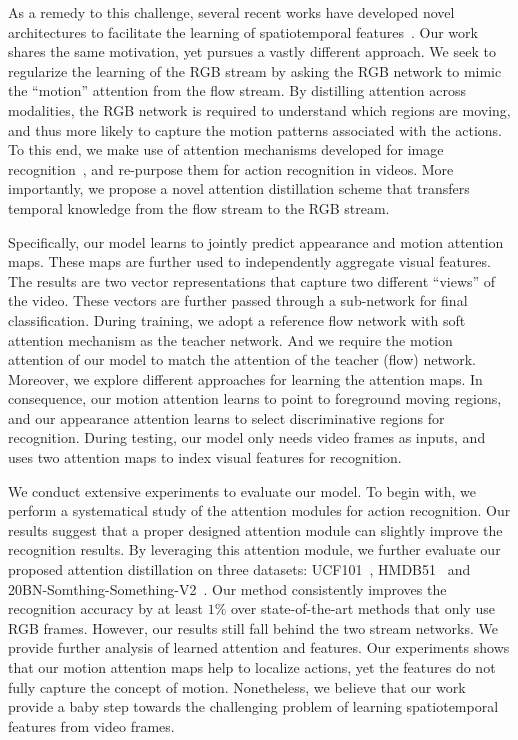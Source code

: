 \documentclass[10pt,twocolumn,letterpaper]{article}
\begin{document}
As a remedy to this challenge, several recent works have developed novel architectures to facilitate the learning of spatiotemporal features~\cite{Hara_2018_CVPR,Tran_2018_CVPR,Xie_2018_ECCV,Sun_2018_CVPR,fan2018end}. Our work shares the same motivation, yet pursues a vastly different approach. We seek to regularize the learning of the RGB stream by asking the RGB network to mimic the ``motion'' attention from the flow stream. By distilling attention across modalities, the RGB network is required to understand which regions are moving, and thus more likely to capture the motion patterns associated with the actions. To this end, we make use of attention mechanisms developed for image recognition~\cite{wang2017residual,Zagoruyko2017AT}, and re-purpose them for action recognition in videos. More importantly, we propose a novel attention distillation scheme that transfers temporal knowledge from the flow stream to the RGB stream. 

Specifically, our model learns to jointly predict appearance and motion attention maps. These maps are further used to independently aggregate visual features. The results are two vector representations that capture two different ``views'' of the video. These vectors are further passed through a sub-network for final classification. During training, we adopt a reference flow network with soft attention mechanism as the teacher network. And we require the motion attention of our model to match the attention of the teacher (flow) network. Moreover, we explore different approaches for learning the attention maps. In consequence, our motion attention learns to point to foreground moving regions, and our appearance attention learns to select discriminative regions for recognition. During testing, our model only needs video frames as inputs, and uses two attention maps to index visual features for recognition. 

We conduct extensive experiments to evaluate our model. To begin with, we perform a systematical study of the attention modules for action recognition. Our results suggest that a proper designed attention module can slightly improve the recognition results. By leveraging this attention module, we further evaluate our proposed attention distillation on three datasets: UCF101~\cite{Soomro2012UCF101AD}, HMDB51~\cite{kuehne2011hmdb} and 20BN-Somthing-Something-V2~\cite{goyal2017something,mahdisoltani2018fine}. Our method consistently improves the recognition accuracy by at least $1\%$ over state-of-the-art methods that only use RGB frames. However, our results still fall behind the two stream networks. We provide further analysis of learned attention and features. Our experiments shows that our motion attention maps help to localize actions, yet the features do not fully capture the concept of motion. Nonetheless, we believe that our work provide a baby step towards the challenging problem of learning spatiotemporal features from video frames. 
\end{document}
